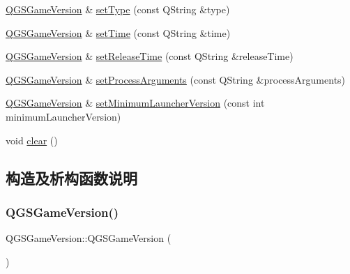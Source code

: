 \begin{DoxyCompactItemize}
\item 
\mbox{\hyperlink{class_q_g_s_game_version}{Q\+G\+S\+Game\+Version}} \& \mbox{\hyperlink{class_q_g_s_game_version_abea597512458faf8061f2430163b0952}{set\+Type}} (const Q\+String \&type)
\item 
\mbox{\hyperlink{class_q_g_s_game_version}{Q\+G\+S\+Game\+Version}} \& \mbox{\hyperlink{class_q_g_s_game_version_a77397892df9a9a9e6592bf8ad72894ce}{set\+Time}} (const Q\+String \&time)
\item 
\mbox{\hyperlink{class_q_g_s_game_version}{Q\+G\+S\+Game\+Version}} \& \mbox{\hyperlink{class_q_g_s_game_version_ae0ea530cc81e7bb3617707e539ef8a76}{set\+Release\+Time}} (const Q\+String \&release\+Time)
\item 
\mbox{\hyperlink{class_q_g_s_game_version}{Q\+G\+S\+Game\+Version}} \& \mbox{\hyperlink{class_q_g_s_game_version_adbb9d573d730ac3b84d5dd647c084d61}{set\+Process\+Arguments}} (const Q\+String \&process\+Arguments)
\item 
\mbox{\hyperlink{class_q_g_s_game_version}{Q\+G\+S\+Game\+Version}} \& \mbox{\hyperlink{class_q_g_s_game_version_a42527c9cfcdb7d1e612d47f5d8f42907}{set\+Minimum\+Launcher\+Version}} (const int minimum\+Launcher\+Version)
\item 
void \mbox{\hyperlink{class_q_g_s_game_version_a80f3a84df7c6ca8d3bf2b87687054875}{clear}} ()
\end{DoxyCompactItemize}


\subsection{构造及析构函数说明}
\mbox{\label{class_q_g_s_game_version_a21d7ee66426a4bdeab6c8d6c8a7ab487}} 
\subsubsection{\texorpdfstring{Q\+G\+S\+Game\+Version()}{QGSGameVersion()}\hspace{0.1cm}{\footnotesize\ttfamily [1/3]}}
{\footnotesize\ttfamily Q\+G\+S\+Game\+Version\+::\+Q\+G\+S\+Game\+Version (\begin{DoxyParamCaption}{ }\end{DoxyParamCaption})}

